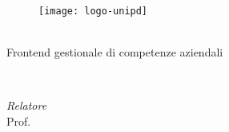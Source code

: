 
\begin{titlepage}

\begin{center}

\begin{LARGE}
\textbf{\myUni}\\
\end{LARGE}

\vspace{10pt}

\begin{Large}
\textsc{\myDepartment}\\
\end{Large}

\vspace{10pt}

\begin{large}
\textsc{\myFaculty}\\
\end{large}

\vspace{30pt}
\begin{figure}[htbp]
\begin{center}
\texttt{[image: logo-unipd]}
\end{center}
\end{figure}
\vspace{30pt} 

\begin{LARGE}
\begin{center}
\textbf{\myTitle}\\
Frontend gestionale di competenze aziendali
\end{center}
\end{LARGE}

\vspace{10pt} 

\begin{large}
\textsl{\myDegree}\\
\end{large}

\vspace{40pt} 

\begin{large}
\begin{flushleft}
\textit{Relatore}\\ 
\vspace{5pt} 
Prof. \myProf
\end{flushleft}


\end{large}
\end{center}
\end{titlepage}
